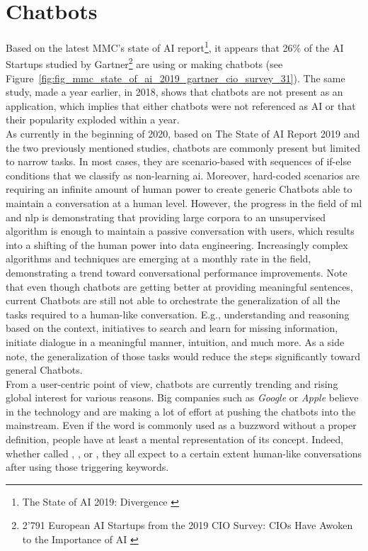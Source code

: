 \chapter{Chatbots}
\label{chap:chatbots}

Based on the latest MMC's state of AI report\footnote{The State of AI 2019: Divergence \autocite{report:Kelnar2019}}, it appears that 26\% of the AI Startups studied by Gartner\footnote{2'791 European AI Startups from the 2019 CIO Survey: CIOs Have Awoken to the Importance of AI \autocite{online:gartner_2019_ai_survey}} are using or making chatbots (see Figure~\ref{fig:fig_mmc_state_of_ai_2019_gartner_cio_survey_31}). The same study, made a year earlier, in 2018, shows that chatbots are not present as an application, which implies that either chatbots were not referenced as AI or that their popularity exploded within a year.\\

As currently in the beginning of 2020, based on The State of AI Report 2019 \autocite{studies:state_of_ai_2019} and the two previously mentioned studies, chatbots are commonly present but limited to narrow tasks. In most cases, they are scenario-based with sequences of if-else conditions that we classify as non-learning \gls{ai}. Moreover, hard-coded scenarios are requiring an infinite amount of human power to create generic Chatbots able to maintain a conversation at a human level. However, the progress in the field of \gls{ml} and \gls{nlp} is demonstrating that providing large corpora to an unsupervised algorithm is enough to maintain a passive conversation with users, which results into a shifting of the human power into data engineering. Increasingly complex algorithms and techniques are emerging at a monthly rate in the field, demonstrating a trend toward conversational performance improvements. Note that even though chatbots are getting better at providing meaningful sentences, current Chatbots are still not able to orchestrate the generalization of all the tasks required to a human-like conversation. E.g., understanding and reasoning based on the context, initiatives to search and learn for missing information, initiate dialogue in a meaningful manner, intuition, and much more. As a side note, the generalization of those tasks would reduce the steps significantly toward general Chatbots.\\

From a user-centric point of view, chatbots are currently trending and rising global interest for various reasons. Big companies such as \textit{Google} or \textit{Apple} believe in the technology and are making a lot of effort at pushing the chatbots into the mainstream. Even if the word  is commonly used as a buzzword without a proper definition, people have at least a mental representation of its concept. Indeed, whether called , ,  or , they all expect to a certain extent human-like conversations after using those triggering keywords.\\


